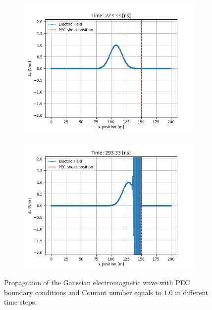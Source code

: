 \documentclass[12pt, oneside]{book}
\begin{document}
\begin{figure}[H]
    \centering
    \begin{subfigure}[b]{0.49\textwidth}
        \centering
        \includegraphics[width=\textwidth]{Imagenes/CFDTD1D_Inestibility1.png}
    \end{subfigure}
    \begin{subfigure}[b]{0.49\textwidth}
        \centering
        \includegraphics[width=\textwidth]{Imagenes/CFDTD1D_Inestibility2.png}
    \end{subfigure}
    \caption{Propagation of the Gaussian electromagnetic wave with PEC boundary conditions and Courant number equals to $1.0$ in different time steps.}
    \label{fig:CFDTD1D_Inestability}
\end{figure}
\end{document}
